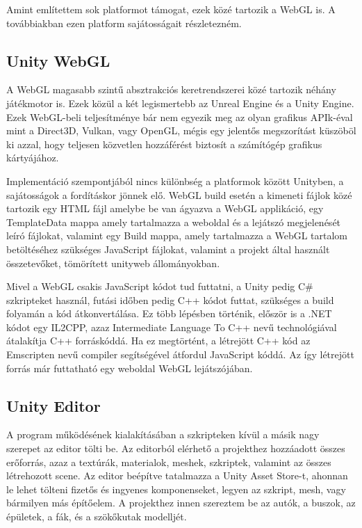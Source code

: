 Amint említettem sok platformot támogat, ezek közé tartozik a WebGL is. A továbbiakban ezen platform sajátosságait részletezném.
\subsection{Unity WebGL}
A WebGL magasabb szintű absztrakciós keretrendszerei közé tartozik néhány játékmotor is. Ezek közül a két legismertebb az Unreal Engine és a Unity Engine. Ezek WebGL-beli teljesítménye bár nem egyezik meg az olyan grafikus APIk-éval mint a Direct3D, Vulkan, vagy OpenGL, mégis egy jelentős megszorítást küszöböl ki azzal, hogy teljesen közvetlen hozzáférést biztosít a számítógép grafikus kártyájához.

Implementáció szempontjából nincs különbség a platformok között Unityben, a sajátosságok a fordításkor jönnek elő. WebGL build esetén a kimeneti fájlok közé tartozik egy HTML fájl amelybe be van ágyazva a WebGL applikáció, egy TemplateData mappa amely tartalmazza a weboldal és a lejátszó megjelenését leíró fájlokat, valamint egy Build mappa, amely tartalmazza a WebGL tartalom betöltéséhez szükséges JavaScript fájlokat, valamint a projekt által használt összetevőket, tömörített unityweb állományokban.

Mivel a WebGL csakis JavaScript kódot tud futtatni, a Unity pedig C\# szkripteket használ, futási időben pedig C++ kódot futtat, szükséges a build folyamán a kód átkonvertálása. Ez több lépésben történik, először is a .NET kódot egy IL2CPP, azaz Intermediate Language To C++ nevű technológiával átalakítja C++ forráskóddá.  Ha ez megtörtént, a létrejött C++ kód az Emscripten nevű compiler segítségével átfordul JavaScript kóddá. Az így létrejött forrás már futtatható egy weboldal WebGL lejátszójában.
\subsection{Unity Editor}
A program működésének kialakításában a szkripteken kívül a másik nagy szerepet az editor tölti be. Az editorból elérhető a projekthez hozzáadott összes erőforrás, azaz a textúrák, materialok, meshek, szkriptek, valamint az összes létrehozott scene.
Az editor beépítve tatalmazza a Unity Asset Store-t, ahonnan le lehet tölteni fizetős és ingyenes komponenseket, legyen az szkript, mesh, vagy bármilyen más építőelem. A projekthez innen szereztem be az autók, a buszok, az épületek, a fák, és a szökőkutak modelljét.

